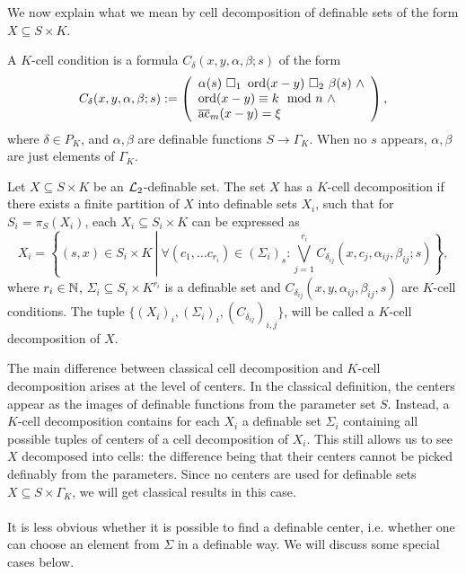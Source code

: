 We now explain what we mean by cell decomposition of definable sets of the form $X\subseteq S\times K$. 

\begin{defn}\label{def:cellcondition} A $K$-cell condition is a formula $C_{\delta}(x,y,\alpha,\beta;s)$ of the form
 \begin{equation*}
C_\delta(x,y,\alpha,\beta;s):= \left(\begin{array}{l} \alpha(s)\ \square_1 \ \ord(x-y) \ \square_2 \ \beta(s) \ \wedge\\ \ord(x-y) \equiv k\mod n \ \wedge\\ \ac_{m}(x-y) = \xi \end{array} \right),
\end{equation*}
where $\delta \in P_K$, and $\alpha, \beta$ are definable functions $S\to \Gamma_K$. When no $s$ appears, $\alpha,\beta$ are just elements of $\Gamma_K$. 
\end{defn}

\begin{defn}\label{def:celdecB}
Let $X \subseteq S \times K$ be an $\mathcal{L}_2$-definable set. The set $X$ has a $K$-cell decomposition if there exists a finite partition of $X$ into definable sets $X_i$, such that for $S_i=\pi_S(X_i)$, each $X_i\subseteq S_i \times K$ can be expressed as
\[X_i = \left\{(s,x) \in S_i \times K \ \left| \ \forall (c_1, \ldots c_{r_i}) \in (\Sigma_i)_s: \bigvee_{j=1}^{r_i} C_{\delta_{ij}}(x,c_j, \alpha_{ij}, \beta_{ij};s)\right\}\right.,\]
where $r_i \in {{\mathbb N}}$, $\Sigma_i \subseteq S_i \times K^{r_i}$ is a definable set and $C_{\delta_{ij}}(x,y,\alpha_{ij},\beta_{ij},s)$ are $K$-cell conditions. The tuple $\{(X_i )_{i},(\Sigma_i)_{i}, (C_{\delta_{ij}})_{i,j}\}$,  will be called a $K$-cell decomposition of $X$. 
\end{defn}

The main difference between classical cell decomposition and $K$-cell decomposition arises at the level of centers. In the classical definition, the centers appear as the images of definable functions from the parameter set $S$. Instead, a $K$-cell decomposition contains for each $X_i$ a definable set $\Sigma_i$ containing all possible tuples of centers of a cell decomposition of $X_i$. This still allows us to see $X$ decomposed into cells: the difference being that their centers cannot be picked definably from the parameters. Since no centers are used for definable sets $X\subseteq S\times \Gamma_K$, we will get classical results in this case. 
\\\\
It is less obvious whether it is possible to find a definable center, i.e. whether one can choose an element from $\Sigma$ in a definable way. We will discuss some special cases below.

